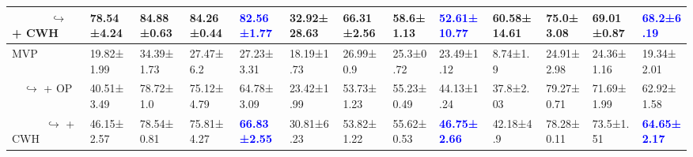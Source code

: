 \begin{table*}[ht]
{\begin{tabular}{l|llla|llla|llla}
\ \ \ \ \ \ $\hookrightarrow$ + CWH           & 78.54{\scriptsize±4.24} & 84.88{\scriptsize±0.63} & 84.26{\scriptsize±0.44} & \textbf{\textcolor{blue}{82.56{\scriptsize±1.77}}} & 32.92{\scriptsize±28.63} & 66.31{\scriptsize±2.56} & 58.6{\scriptsize±1.13} & \textbf{\textcolor{blue}{52.61{\scriptsize±10.77}}} & 60.58{\scriptsize±14.61} & 75.0{\scriptsize±3.08} & 69.01{\scriptsize±0.87} & \textbf{\textcolor{blue}{68.2{\scriptsize±6.19}}} \\
\hline
MVP                                         & 19.82{\scriptsize±1.99} & 34.39{\scriptsize±1.73} & 27.47{\scriptsize±6.2} & 27.23{\scriptsize±3.31} & 18.19{\scriptsize±1.73} & 26.99{\scriptsize±0.9} & 25.3{\scriptsize±0.72} & 23.49{\scriptsize±1.12} & 8.74{\scriptsize±1.9} & 24.91{\scriptsize±2.98} & 24.36{\scriptsize±1.16} & 19.34{\scriptsize±2.01} \\
\ \  $\hookrightarrow$ + OP                 & 40.51{\scriptsize±3.49} & 78.72{\scriptsize±1.0} & 75.12{\scriptsize±4.79} & 64.78{\scriptsize±3.09} & 23.42{\scriptsize±1.99} & 53.73{\scriptsize±1.23} & 55.23{\scriptsize±0.49} & 44.13{\scriptsize±1.24} & 37.8{\scriptsize±2.03} & 79.27{\scriptsize±0.71} & 71.69{\scriptsize±1.99} & 62.92{\scriptsize±1.58} \\
\ \ \ \ \ \ $\hookrightarrow$ + CWH         & 46.15{\scriptsize±2.57} & 78.54{\scriptsize±0.81} & 75.81{\scriptsize±4.27} & \textbf{\textcolor{blue}{66.83{\scriptsize±2.55}}} & 30.81{\scriptsize±6.23} & 53.82{\scriptsize±1.22} & 55.62{\scriptsize±0.53} & \textbf{\textcolor{blue}{46.75{\scriptsize±2.66}}} & 42.18{\scriptsize±4.9} & 78.28{\scriptsize±0.11} & 73.5{\scriptsize±1.51} & \textbf{\textcolor{blue}{64.65{\scriptsize±2.17}}} \\
\bottomrule
    \end{tabular}
    \label{tab:clear_old}}
\end{table*}
